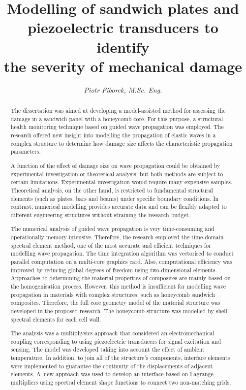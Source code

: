 \documentclass[12pt,a4paper,final]{article}
\title{\textbf{Modelling of sandwich plates and piezoelectric transducers to identify \\the severity of mechanical damage}}
\author{\textit{Piotr Fiborek, M.Sc. Eng.}\\
	\multicolumn{1}{p{.7\textwidth}}{\centering
		\vspace{0.5cm}
		{Institute of Fluid Flow Machinery,\\
		Polish Academy of Sciences}\\
	\vspace{0.5cm}
		Supervisor: {\textit{Pawe\l{} Kudela, D.Sc. Ph.D. Eng.}}\\
			}}
\begin{document}
\maketitle
%
\begin{abstract}

The dissertation was aimed at developing a model-assisted method for assessing the damage in a sandwich panel with a honeycomb core. For this purpose, a structural health monitoring technique based on guided wave propagation was employed. The research offered new insight into modelling the propagation of elastic waves in a complex structure to determine how damage size affects the characteristic propagation parameters.

A function of the effect of damage size on wave propagation could be obtained by experimental investigation or theoretical analysis, but both methods are subject to certain limitations. Experimental investigation would require many expensive samples. Theoretical analysis, on the other hand, is restricted to fundamental structural elements (such as plates, bars and beams) under specific boundary conditions. In contrast, numerical modelling provides accurate data and can be flexibly adapted to different engineering structures without straining the research budget.

The numerical analysis of guided wave propagation is very time-consuming and operationally memory-intensive. Therefore, the research employed the time-domain spectral element method, one of the most accurate and efficient techniques for modelling wave propagation. The time integration algorithm was vectorised to conduct parallel computation on a multi-core graphics card. Also, computational efficiency was improved by reducing global degrees of freedom using two-dimensional elements.
Approaches to determining the material properties of composites are mainly based on the homogenisation process. However, this method is insufficient for modelling wave propagation in materials with complex structures, such as honeycomb sandwich composites. Therefore, the full core geometry model of the material structure was developed in the proposed research.
The honeycomb structure was modelled by shell spectral elements for each cell wall.

The analysis was a multiphysics approach that considered an electromechanical coupling corresponding to using piezoelectric transducers for signal excitation and sensing. The model was developed taking into account the effect of ambient temperature. In addition, to join all of the structure's components, interface elements were implemented to guarantee the continuity of the displacements of adjacent elements. A~new approach was used to develop an interface based on Lagrange multipliers using spectral element shape functions to connect two non-matching grids.


\end{abstract}
\end{document}
